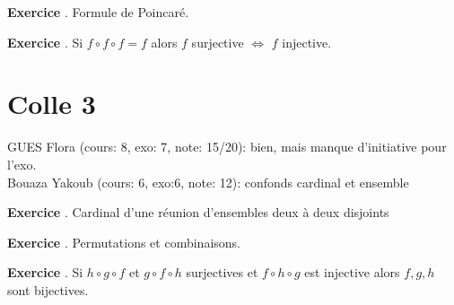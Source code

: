 \documentclass[10pt,a4paper]{article}
\newcounter{question}
\newcounter{exo}
\newenvironment{exo}{\vspace{0.5cm}\setcounter{question}{0}\addtocounter{exo}{1} \noindent \textbf{Exercice \theexo}. \normalsize }{\par}
\begin{document}
	\begin{exo}
		Formule de Poincaré.
	\end{exo}		

	\begin{exo}
		Si $f \circ f \circ f = f$ alors $f$ surjective $\Longleftrightarrow$ $f$ injective.
	\end{exo}	

	\section*{Colle 3}
	\setcounter{exo}{0}
	GUES Flora (cours: 8, exo: 7, note: 15/20): bien, mais manque d'initiative pour l'exo. \\
	Bouaza Yakoub (cours: 6, exo:6, note: 12): confonds cardinal et ensemble\\
	
	\begin{exo}
		Cardinal d'une réunion d'ensembles deux à deux disjoints
	\end{exo}
	
	\begin{exo}
		Permutations et combinaisons.
	\end{exo}	

	\begin{exo}
		Si $h \circ g \circ f$ et $g \circ f \circ h$ surjectives et $f \circ h \circ g$ est injective alors $f, g, h$ sont bijectives.
	\end{exo}		

	
\end{document}
